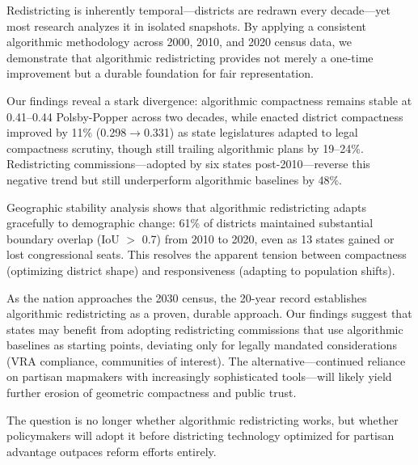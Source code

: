 
Redistricting is inherently temporal—districts are redrawn every decade—yet most research analyzes it in isolated snapshots. By applying a consistent algorithmic methodology across 2000, 2010, and 2020 census data, we demonstrate that algorithmic redistricting provides not merely a one-time improvement but a durable foundation for fair representation.

Our findings reveal a stark divergence: algorithmic compactness remains stable at 0.41--0.44 Polsby-Popper across two decades, while enacted district compactness improved by 11\% (0.298$\to$0.331) as state legislatures adapted to legal compactness scrutiny, though still trailing algorithmic plans by 19--24\%. Redistricting commissions—adopted by six states post-2010—reverse this negative trend but still underperform algorithmic baselines by 48\%.

Geographic stability analysis shows that algorithmic redistricting adapts gracefully to demographic change: 61\% of districts maintained substantial boundary overlap (IoU $>$ 0.7) from 2010 to 2020, even as 13 states gained or lost congressional seats. This resolves the apparent tension between compactness (optimizing district shape) and responsiveness (adapting to population shifts).

As the nation approaches the 2030 census, the 20-year record establishes algorithmic redistricting as a proven, durable approach. Our findings suggest that states may benefit from adopting redistricting commissions that use algorithmic baselines as starting points, deviating only for legally mandated considerations (VRA compliance, communities of interest). The alternative—continued reliance on partisan mapmakers with increasingly sophisticated tools—will likely yield further erosion of geometric compactness and public trust.

The question is no longer whether algorithmic redistricting works, but whether policymakers will adopt it before districting technology optimized for partisan advantage outpaces reform efforts entirely.
